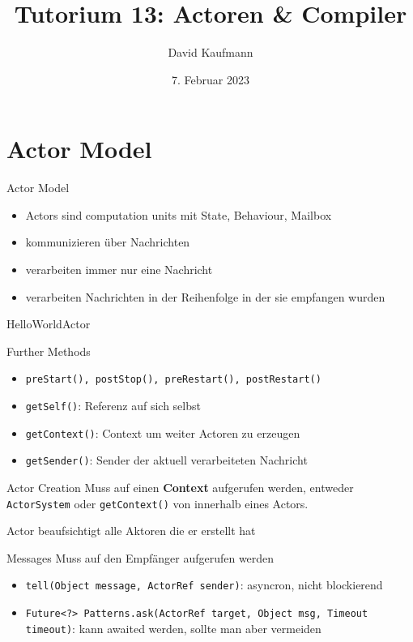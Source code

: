 \documentclass{beamer}
\title{Tutorium 13: Actoren \& Compiler}
\author{David Kaufmann}
\institute{Tutorium Programmierparadigmen am KIT}
\date{7. Februar 2023}
\begin{document}
\begin{frame}
	\titlepage
\end{frame}

\section{Actor Model}
\begin{frame}{Actor Model}
    \begin{itemize}
        \item Actors sind computation units mit State, Behaviour, Mailbox
        \item kommunizieren über Nachrichten
        \item verarbeiten immer nur eine Nachricht
        \item verarbeiten Nachrichten in der Reihenfolge in der sie empfangen wurden
    \end{itemize}
\end{frame}

\begin{frame}{HelloWorldActor}
    \footnotesize
\end{frame}

\begin{frame}{Further Methods}
    \begin{itemize}
        \item \texttt{preStart(), postStop(), preRestart(), postRestart()}
        \item \texttt{getSelf()}: Referenz auf sich selbst
        \item \texttt{getContext()}: Context um weiter Actoren zu erzeugen
        \item \texttt{getSender()}: Sender der aktuell verarbeiteten Nachricht
    \end{itemize}
\end{frame}

\begin{frame}{Actor Creation}
    Muss auf einen \textbf{Context} aufgerufen werden, entweder \texttt{ActorSystem} oder \texttt{getContext()} von innerhalb eines Actors.
    
    Actor beaufsichtigt alle Aktoren die er erstellt hat
    \footnotesize
\end{frame}

\begin{frame}{Messages}
    Muss auf den Empfänger aufgerufen werden
    \begin{itemize}
        \item \texttt{tell(Object message, ActorRef sender)}: asyncron, nicht blockierend
        \item \texttt{Future<?> Patterns.ask(ActorRef target, Object msg, Timeout timeout)}: kann awaited werden, sollte man aber vermeiden
    \end{itemize}
\end{frame}
\end{document}
